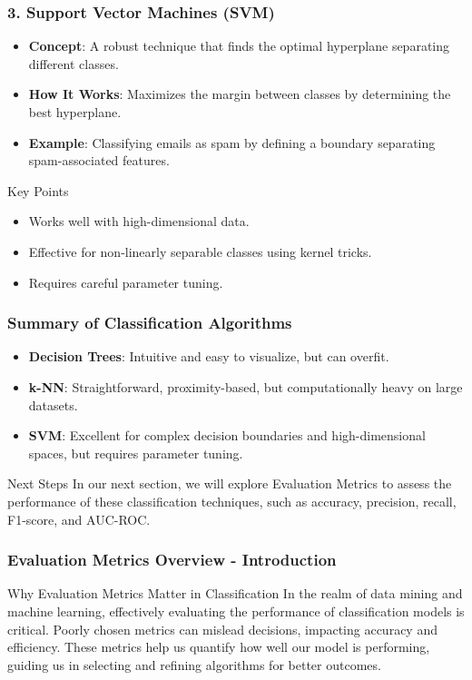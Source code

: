 \documentclass[aspectratio=169]{beamer}
\begin{document}
\begin{frame}[fragile]
    \frametitle{3. Support Vector Machines (SVM)}
    \begin{itemize}
        \item \textbf{Concept}: A robust technique that finds the optimal hyperplane separating different classes.
        \item \textbf{How It Works}: Maximizes the margin between classes by determining the best hyperplane.
        \item \textbf{Example}: Classifying emails as spam by defining a boundary separating spam-associated features.
    \end{itemize}
    \begin{block}{Key Points}
        \begin{itemize}
            \item Works well with high-dimensional data.
            \item Effective for non-linearly separable classes using kernel tricks.
            \item Requires careful parameter tuning.
        \end{itemize}
    \end{block}
\end{frame}

\begin{frame}[fragile]
    \frametitle{Summary of Classification Algorithms}
    \begin{itemize}
        \item \textbf{Decision Trees}: Intuitive and easy to visualize, but can overfit.
        \item \textbf{k-NN}: Straightforward, proximity-based, but computationally heavy on large datasets.
        \item \textbf{SVM}: Excellent for complex decision boundaries and high-dimensional spaces, but requires parameter tuning.
    \end{itemize}
    \begin{block}{Next Steps}
        In our next section, we will explore Evaluation Metrics to assess the performance of these classification techniques, such as accuracy, precision, recall, F1-score, and AUC-ROC.
    \end{block}
\end{frame}

\begin{frame}[fragile]
  \frametitle{Evaluation Metrics Overview - Introduction}
  \begin{block}{Why Evaluation Metrics Matter in Classification}
    In the realm of data mining and machine learning, effectively evaluating the performance of classification models is critical. 
    Poorly chosen metrics can mislead decisions, impacting accuracy and efficiency. 
    These metrics help us quantify how well our model is performing, guiding us in selecting and refining algorithms for better outcomes.
  \end{block}
\end{frame}
\end{document}

